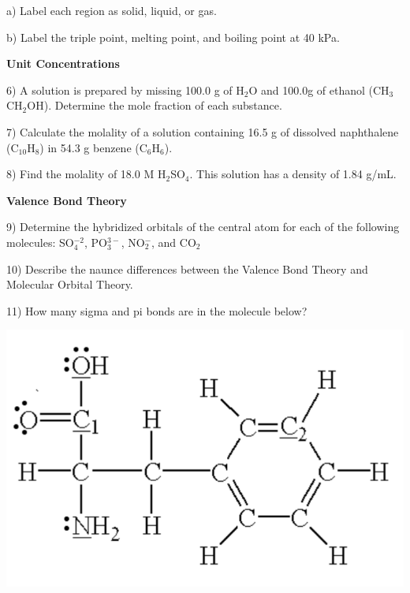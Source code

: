 \documentclass[12pt]{article}
\begin{document}
a) Label each region as solid, liquid, or gas.

b) Label the triple point, melting point, and boiling point at 40 kPa.

\vspace{2in}

\textbf{Unit Concentrations}

6) A solution is prepared by missing 100.0 g of H$_2$O and 100.0g of ethanol (CH$_3$CH$_2$OH).
Determine the mole fraction of each substance.

\vspace{2in}

7) Calculate the molality of a solution containing 16.5 g of dissolved naphthalene (C$_{10}$H$_8$)
in 54.3 g benzene (C$_6$H$_6$).

\vspace{1.5in}

8) Find the molality of 18.0 M H$_2$SO$_4$. This solution has a density of 1.84 g/mL.

\vspace{1.5in}

\textbf{Valence Bond Theory}

9) Determine the hybridized orbitals of the central atom for each of the following molecules:
SO$_4^{-2}$,  PO$_3^{3-}$, NO$_2^-$, and CO$_2$

\vspace{1.5in}

10) Describe the naunce differences between the Valence Bond Theory and Molecular Orbital Theory.

\vspace{2.5in}

11) How many sigma and pi bonds are in the molecule below?

\begin{center}
  \includegraphics[scale=0.3]{sig_pi}
\end{center}
\end{document}

